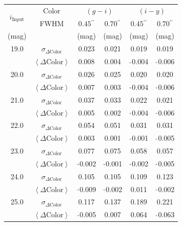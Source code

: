 \documentclass[useamsfonts]{pasj01}
\def\asec{$^{\prime\prime}$}
\newcommand{\minus}{\raisebox{.4\height}{\scalebox{.8}{-}}}
\newcommand{\scolor}{$\sigma_{\Delta\mathrm{Color}}$}
\newcommand{\mcolor}{$\left<{\Delta\mathrm{Color}}\right>$}
\newcommand{\n}{$\minus$}
\begin{document}
\begin{table}
    \begin{center}
    \begin{tabular}{| c | c | c | c | c | c | }
    \hline
    \multirow{2}{*}{$i_{\mathrm{Input}}$} & Color & \multicolumn{2}{|c|}{$(g-i)$} & \multicolumn{2}{|c|}{$(i-y)$} \\
    \cline{2-6}
      & FWHM & $0.45$\asec{} & $0.70$\asec{} & $0.45$\asec{} & $0.70$\asec{} \\
    \hline
    (mag) & & (mag) & (mag) & (mag) & (mag) \\
    \hline
    \rowcolor[gray]{.85} 19.0 & \scolor{} &   0.023 &   0.021 &   0.019 &   0.019 \\
    \rowcolor[gray]{.85}      & \mcolor{} &   0.008 &   0.004 & \n0.004 & \n0.006 \\
    \hline 
    \rowcolor[gray]{1.0} 20.0 & \scolor{} &   0.026 &   0.025 &   0.020 &   0.020 \\
    \rowcolor[gray]{1.0}      & \mcolor{} &   0.007 &   0.003 & \n0.004 & \n0.006 \\
    \hline
    \rowcolor[gray]{.85} 21.0 & \scolor{} &   0.037 &   0.033 &   0.022 &   0.021 \\
    \rowcolor[gray]{.85}      & \mcolor{} &   0.005 &   0.002 & \n0.004 & \n0.006 \\
    \hline
    \rowcolor[gray]{1.0} 22.0 & \scolor{} &   0.054 &   0.051 &   0.031 &   0.031 \\
    \rowcolor[gray]{1.0}      & \mcolor{} &   0.003 &   0.001 & \n0.001 & \n0.005 \\
    \hline
    \rowcolor[gray]{.85} 23.0 & \scolor{} &   0.077 &   0.075 &   0.058 &   0.057 \\
    \rowcolor[gray]{.85}      & \mcolor{} & \n0.002 & \n0.001 & \n0.002 & \n0.005 \\
    \hline
    \rowcolor[gray]{1.0} 24.0 & \scolor{} &   0.105 &   0.105 &   0.109 &   0.123 \\
    \rowcolor[gray]{1.0}      & \mcolor{} & \n0.009 & \n0.002 &   0.011 & \n0.002 \\
    \hline
    \rowcolor[gray]{.85} 25.0 & \scolor{} &   0.117 &   0.137 &   0.189 &   0.221 \\
    \rowcolor[gray]{.85}      & \mcolor{} & \n0.005 &   0.007 &   0.064 & \n0.063 \\

\end{tabular}
\end{center}
\end{table}
\end{document}
